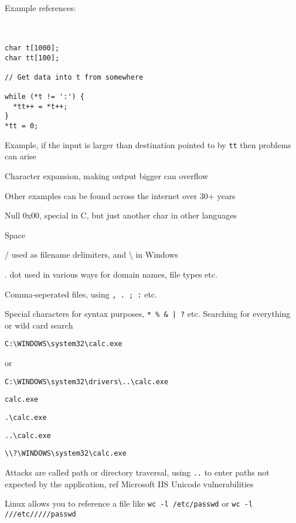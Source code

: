 \documentclass[Screen16to9,17pt]{foils}
\begin{document}
Example references:\\
\\



\begin{verbatim}

char t[1000];
char tt[100];

// Get data into t from somewhere

while (*t != ':') {
  *tt++ = *t++;
}
*tt = 0;
\end{verbatim}

\begin{list2}
\item Example, if the input is larger than destination pointed to by \verb+tt+ then problems can arise
\item Character expansion, making output bigger can overflow
\item Other examples can be found across the internet over 30+ years
\end{list2}


\begin{list2}
\item Null 0x00, special in C, but just another char in other languages
\item Space
\item / used as filename delimiters, and \textbackslash{} in Windows
\item . dot used in various ways for domain names, file types etc.
\item Comma-seperated files, using \verb+, . ; :+ etc.
\item Special characters for syntax purposes, \verb+* % & | ?+ etc. Searching for everything or wild card search
\end{list2}




\verb+C:\WINDOWS\system32\calc.exe+

or
\begin{list2}
\item \verb+C:\WINDOWS\system32\drivers\..\calc.exe+
\item \verb+calc.exe+
\item \verb+.\calc.exe+
\item \verb+..\calc.exe+
\item \verb+\\?\WINDOWS\system32\calc.exe+
\item Attacks are called path or directory traversal, using \verb+..+ to enter paths not expected by the application, ref Microsoft IIS Unicode vulnerabilities

\item Linux allows you to reference a file like \verb+wc -l /etc/passwd+ or \verb+wc -l ///etc/////passwd+
\end{list2}
\end{document}
